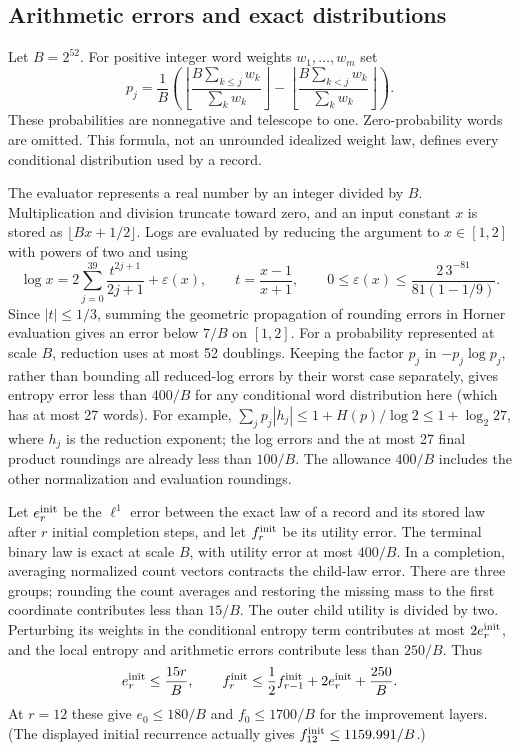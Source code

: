 \documentclass[11pt]{article}
\numberwithin{equation}{section}
\theoremstyle{definition}
\theoremstyle{remark}
\begin{document}
\subsection{Arithmetic errors and exact distributions}

Let $B=2^{52}$.  For positive integer word weights $w_1,\ldots,w_m$ set
\begin{equation}
 p_j=\frac1B\left(
  \left\lfloor\frac{B\sum_{k\le j}w_k}{\sum_kw_k}\right\rfloor-
  \left\lfloor\frac{B\sum_{k<j}w_k}{\sum_kw_k}\right\rfloor\right).
 \label{cert:w-cumulative}
\end{equation}
These probabilities are nonnegative and telescope to one.  Zero-probability
words are omitted.  This formula, not an unrounded idealized weight law,
defines every conditional distribution used by a record.

The evaluator represents a real number by an integer divided by $B$.
Multiplication and division truncate toward zero, and an input constant
$x$ is stored as $\lfloor Bx+1/2\rfloor$.  Logs are evaluated by reducing
the argument to $x\in[1,2]$ with powers of two and using
\begin{equation}
 \log x=2\sum_{j=0}^{39}\frac{t^{2j+1}}{2j+1}
                  +\varepsilon(x),\qquad
 t=\frac{x-1}{x+1},\qquad
 0\le\varepsilon(x)\le\frac{2\,3^{-81}}{81(1-1/9)}.
 \label{cert:w-log-evaluation}
\end{equation}
Since $|t|\le1/3$, summing the geometric propagation of rounding errors
in Horner evaluation gives an error below $7/B$ on $[1,2]$.
For a probability represented at scale $B$, reduction uses at most 52
doublings.  Keeping the factor $p_j$ in $-p_j\log p_j$, rather than
bounding all reduced-log errors by their worst case separately, gives
entropy error less than $400/B$ for any conditional word distribution
here (which has at most 27 words).  For example,
$\sum_jp_j|h_j|\le1+H(p)/\log2\le1+\log_2 27$, where $h_j$ is the
reduction exponent; the log errors and the at most 27 final product
roundings are already less than $100/B$.  The allowance $400/B$ includes
the other normalization and evaluation roundings.

Let $e_r^{\rm init}$ be the $\ell^1$ error between the exact law of a
record and its stored law after $r$ initial completion steps, and let
$f_r^{\rm init}$ be its utility error.  The terminal binary law is exact
at scale $B$, with utility error at most $400/B$.  In a completion,
averaging normalized count vectors contracts the child-law error.
There are three groups; rounding the count averages and restoring the
missing mass to the first coordinate contributes less than $15/B$.
The outer child utility is divided by two.  Perturbing its weights in the
conditional entropy term contributes at most $2e_r^{\rm init}$, and
the local entropy and arithmetic errors contribute less than $250/B$.
Thus
\begin{equation}
 e_r^{\rm init}\le\frac{15r}{B},\qquad
 f_r^{\rm init}\le\frac12 f_{r-1}^{\rm init}
                      +2e_r^{\rm init}+\frac{250}{B}.
 \label{cert:w-initial-errors}
\end{equation}
At $r=12$ these give $e_0\le180/B$ and $f_0\le1700/B$ for the
improvement layers.  (The displayed initial recurrence actually gives
$f_{12}^{\rm init}\le1159.991/B$.)
\end{document}

